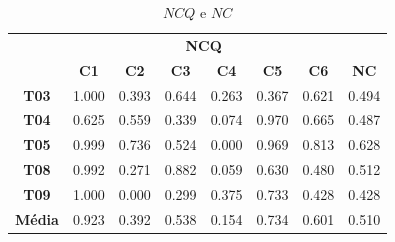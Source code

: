 \begin{table}[htbp]
	\centering
	\caption{$NCQ$ e $NC$}
	\begin{tabular}{|c|cccccc|c|}
		\hline
		\rowcolor[HTML]{D0CECE} 
		\cellcolor[HTML]{D0CECE} & \multicolumn{6}{c|}{\cellcolor[HTML]{D0CECE}\textbf{NCQ}} & \cellcolor[HTML]{D0CECE} \\ \cline{2-7}
		\rowcolor[HTML]{D0CECE} 
		\multirow{-2}{*}{\cellcolor[HTML]{D0CECE}\textbf{Participante}} & \multicolumn{1}{c|}{\cellcolor[HTML]{D0CECE}\textbf{C1}} & \multicolumn{1}{c|}{\cellcolor[HTML]{D0CECE}\textbf{C2}} & \multicolumn{1}{c|}{\cellcolor[HTML]{D0CECE}\textbf{C3}} & \multicolumn{1}{c|}{\cellcolor[HTML]{D0CECE}\textbf{C4}} & \multicolumn{1}{c|}{\cellcolor[HTML]{D0CECE}\textbf{C5}} & \textbf{C6} & \multirow{-2}{*}{\cellcolor[HTML]{D0CECE}\textbf{NC}} \\ \hline
		\rowcolor[HTML]{FFFFFF} 
		\textbf{T03} & \multicolumn{1}{c|}{\cellcolor[HTML]{FFFFFF}1.000} & \multicolumn{1}{c|}{\cellcolor[HTML]{FFFFFF}0.393} & \multicolumn{1}{c|}{\cellcolor[HTML]{FFFFFF}0.644} & \multicolumn{1}{c|}{\cellcolor[HTML]{FFFFFF}0.263} & \multicolumn{1}{c|}{\cellcolor[HTML]{FFFFFF}0.367} & 0.621 & 0.494 \\ \hline
		\rowcolor[HTML]{E7E6E6} 
		\textbf{T04} & \multicolumn{1}{c|}{\cellcolor[HTML]{E7E6E6}0.625} & \multicolumn{1}{c|}{\cellcolor[HTML]{E7E6E6}0.559} & \multicolumn{1}{c|}{\cellcolor[HTML]{E7E6E6}0.339} & \multicolumn{1}{c|}{\cellcolor[HTML]{E7E6E6}0.074} & \multicolumn{1}{c|}{\cellcolor[HTML]{E7E6E6}0.970} & 0.665 & 0.487 \\ \hline
		\rowcolor[HTML]{FFFFFF} 
		\textbf{T05} & \multicolumn{1}{c|}{\cellcolor[HTML]{FFFFFF}0.999} & \multicolumn{1}{c|}{\cellcolor[HTML]{FFFFFF}0.736} & \multicolumn{1}{c|}{\cellcolor[HTML]{FFFFFF}0.524} & \multicolumn{1}{c|}{\cellcolor[HTML]{FFFFFF}0.000} & \multicolumn{1}{c|}{\cellcolor[HTML]{FFFFFF}0.969} & 0.813 & 0.628 \\ \hline
		\rowcolor[HTML]{E7E6E6} 
		\textbf{T08} & \multicolumn{1}{c|}{\cellcolor[HTML]{E7E6E6}0.992} & \multicolumn{1}{c|}{\cellcolor[HTML]{E7E6E6}0.271} & \multicolumn{1}{c|}{\cellcolor[HTML]{E7E6E6}0.882} & \multicolumn{1}{c|}{\cellcolor[HTML]{E7E6E6}0.059} & \multicolumn{1}{c|}{\cellcolor[HTML]{E7E6E6}0.630} & 0.480 & 0.512 \\ \hline
		\rowcolor[HTML]{FFFFFF} 
		\textbf{T09} & \multicolumn{1}{c|}{\cellcolor[HTML]{FFFFFF}1.000} & \multicolumn{1}{c|}{\cellcolor[HTML]{FFFFFF}0.000} & \multicolumn{1}{c|}{\cellcolor[HTML]{FFFFFF}0.299} & \multicolumn{1}{c|}{\cellcolor[HTML]{FFFFFF}0.375} & \multicolumn{1}{c|}{\cellcolor[HTML]{FFFFFF}0.733} & 0.428 & 0.428 \\ \hline
		\rowcolor[HTML]{D9D9D9} 
		\textbf{Média} & \multicolumn{1}{c|}{\cellcolor[HTML]{D9D9D9}0.923} & \multicolumn{1}{c|}{\cellcolor[HTML]{D9D9D9}0.392} & \multicolumn{1}{c|}{\cellcolor[HTML]{D9D9D9}0.538} & \multicolumn{1}{c|}{\cellcolor[HTML]{D9D9D9}0.154} & \multicolumn{1}{c|}{\cellcolor[HTML]{D9D9D9}0.734} & 0.601 & 0.510 \\ \hline
	\end{tabular}
	\label{tab:F3_A4_NCQ}
\end{table}

